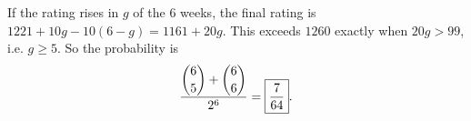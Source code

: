 If the rating rises in $g$ of the $6$ weeks, the final rating is $1221+10g-10(6-g)=1161+20g$. This exceeds $1260$ exactly when $20g>99$, i.e. $g\ge5$. So the probability is
\[\dfrac{\dbinom65+\dbinom66}{2^6}=\boxed{\dfrac{7}{64}}.\]
